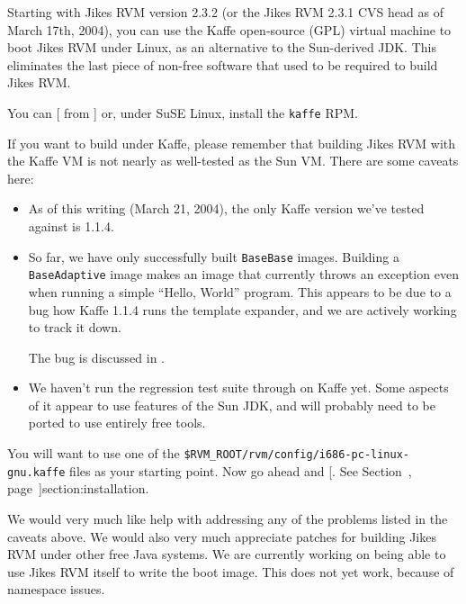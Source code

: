 Starting with Jikes RVM version 2.3.2 (or the Jikes RVM 2.3.1 CVS head
as of March 17th, 2004), you can use the Kaffe open-source (GPL)
virtual machine to boot Jikes RVM under Linux, as an alternative to
the Sun-derived JDK.  This eliminates the last piece of non-free
software that used to be required to build Jikes RVM.

You can [ from {\tt \KaffeURL}]{\KaffeURL} or,
under SuSE Linux, install the {\tt kaffe} RPM.  

If you want to build under Kaffe, please remember that building Jikes
RVM with the Kaffe VM is not nearly as well-tested as the Sun VM.
There are some caveats here:

\begin{itemize}

\item As of this writing (March 21, 2004), the only Kaffe version we've
  tested against is 1.1.4.  

\item So far, we have only successfully built {\tt BaseBase}{\it *}
  images.  Building a \texttt{BaseAdaptive}{\it *} image makes an
  image that currently throws an exception even when running a simple
  ``Hello, World'' program.  This appears to be due to a bug how Kaffe
  1.1.4 runs the template expander, and we are actively working to
  track it down.  

  The bug is discussed in 
  .

\item We haven't run the regression test suite through on Kaffe yet.
  Some aspects of it appear to use features of the Sun JDK, and will
  probably need to be ported to use entirely free tools.

\end{itemize}

You will want to use one of the 
{\tt \$RVM\_\-ROOT/rvm/config/i686-pc-linux-gnu.kaffe{\it *}} files as
your starting point.  Now go ahead and [.  
  See Section~\Ref, page~\Pageref]{section:installation}. 

We would very much like help with addressing any of the problems
listed in the caveats above.  We would also very much appreciate
patches for building Jikes RVM under other free Java systems.  We are
currently working on being able to use Jikes RVM itself to write the
boot image.  This does not yet work, because of namespace issues.


